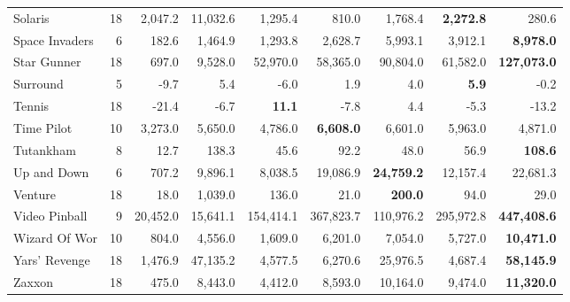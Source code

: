 \begin{table}[t]
\begin{center}
\begin{tabular}{l|rrr|rrr|rr}
             Solaris &              18 &    2,047.2 &  11,032.6 &    1,295.4 &      810.0 &    1,768.4 &{\bf2,272.8}&        280.6 \\
      Space Invaders &               6 &      182.6 &   1,464.9 &    1,293.8 &    2,628.7 &    5,993.1 &    3,912.1 &{\bf8,978.0}\\
         Star Gunner &              18 &      697.0 &   9,528.0 &   52,970.0 &   58,365.0 &   90,804.0 &   61,582.0 &{\bf127,073.0}\\
           Surround  &               5 &       -9.7 &       5.4 &       -6.0 &        1.9 &        4.0 &{\bf5.9}&         -0.2 \\
              Tennis &              18 &      -21.4 &      -6.7 &{\bf11.1}&       -7.8 &        4.4 &       -5.3 &        -13.2 \\
          Time Pilot &              10 &    3,273.0 &   5,650.0 &    4,786.0 &{\bf6,608.0}&    6,601.0 &    5,963.0 &      4,871.0 \\
           Tutankham &               8 &       12.7 &     138.3 &       45.6 &       92.2 &       48.0 &       56.9 &{\bf108.6}\\
         Up and Down &               6 &      707.2 &   9,896.1 &    8,038.5 &   19,086.9 &{\bf24,759.2}&   12,157.4 &     22,681.3 \\
             Venture &              18 &       18.0 &   1,039.0 &      136.0 &       21.0 &{\bf200.0}&       94.0 &         29.0 \\
       Video Pinball &               9 &   20,452.0 &  15,641.1 &  154,414.1 &  367,823.7 &  110,976.2 &  295,972.8 &{\bf447,408.6}\\
       Wizard Of Wor &              10 &      804.0 &   4,556.0 &    1,609.0 &    6,201.0 &    7,054.0 &    5,727.0 &{\bf10,471.0}\\
       Yars' Revenge &              18 &    1,476.9 &  47,135.2 &    4,577.5 &    6,270.6 &   25,976.5 &    4,687.4 &{\bf58,145.9}\\
              Zaxxon &              18 &      475.0 &   8,443.0 &    4,412.0 &    8,593.0 &   10,164.0 &    9,474.0 &{\bf11,320.0}\\
  \end{tabular}
\end{center}
\end{table}

